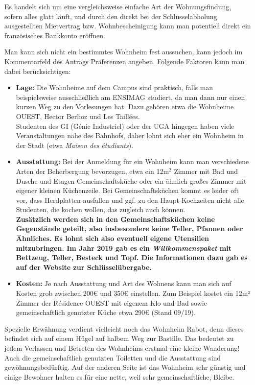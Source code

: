 \documentclass[11pt,a4paper]{article}
\newcommand{\change}[1]{{\bf #1}}
\begin{document}
	Es handelt sich um eine vergleichsweise einfache Art der Wohnungsfindung, sofern alles glatt läuft, und durch den direkt bei der Schlüsselabholung ausgestellten Mietvertrag bzw. Wohnbescheinigung kann man potentiell direkt ein französisches Bankkonto eröffnen.
	
	Man kann sich nicht ein bestimmtes Wohnheim fest aussuchen, kann jedoch im Kommentarfeld des Antrags Präferenzen angeben. Folgende Faktoren kann man dabei berücksichtigen:
	
	\begin{itemize}
		\item \textbf{Lage:} Die Wohnheime auf dem Campus sind praktisch, falls man beispielsweise ausschließlich am ENSIMAG studiert, da man dann nur einen kurzen Weg zu den Vorlesungen hat. Dazu gehören etwa die Wohnheime OUEST, Hector Berlioz und Les Taillées. \\
		Studenten des GI (Génie Industriel) oder der UGA hingegen haben viele Veranstaltungen nahe des Bahnhofs, daher lohnt sich eher ein Wohnheim in der Stadt (etwa \emph{Maison des étudiants}).
  \item \textbf{Ausstattung:} Bei der Anmeldung für ein Wohnheim kann man verschiedene Arten der Beherbergung bevorzugen, etwa ein 12m$^2$ Zimmer mit Bad und Dusche und Etagen-Gemeinschaftsküche oder ein ähnlich großes Zimmer mit eigener kleinen Küchenzeile. Bei Gemeinschaftsküchen kommt es leider oft vor, dass Herdplatten ausfallen und ggf. zu den Haupt-Kochzeiten nicht alle Studenten, die kochen wollen, das zugleich auch können.\\
    \change{Zusätzlich werden sich in den Gemeinschaftsküchen keine Gegenstände geteilt, also insbesondere keine Teller, Pfannen oder Ähnliches. Es lohnt sich also eventuell eigene Utensilien mitzubringen. Im Jahr 2019 gab es ein \textit{Willkommenspaket} mit Bettzeug, Teller, Besteck und Topf. Die Informationen dazu gab es auf der Website zur Schlüsselübergabe.}
		\item \textbf{Kosten:} Je nach Ausstattung und Art des Wohnens kann man sich auf Kosten grob zwischen 200€ und 350€ einstellen. Zum Beispiel kostet ein 12m² Zimmer der Résidence OUEST mit eigenem Klo und Bad sowie gemeinschaftlich genutzter Küche etwa 290€ (Stand 09/19).
	\end{itemize}

	Spezielle Erwähnung verdient vielleicht noch das Wohnheim Rabot, denn dieses befindet sich auf einem Hügel auf halbem Weg zur Bastille. Das bedeutet zu jedem Verlassen und Betreten des Wohnheims erstmal eine kleine Wanderung! Auch die gemeinschaftlich genutzten Toiletten und die Ausstattung sind gewöhnungsbedürftig. Auf der anderen Seite ist das Wohnheim sehr günstig und einige Bewohner halten es für eine nette, weil sehr gemeinschaftliche, Bleibe.
	
\end{document}
